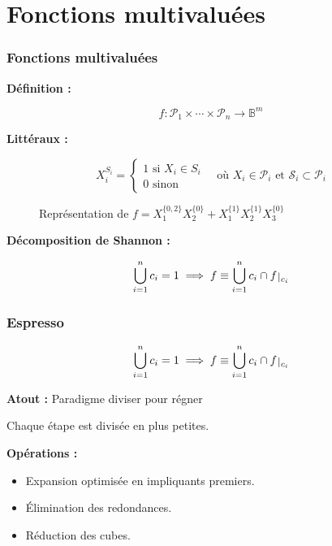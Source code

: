\documentclass[handout]{beamer}
\newcommand{\ens}[1]{{\lbrace{} #1 \rbrace{}}}
\def\restriction#1#2{\mathchoice
              {\setbox1\hbox{${\displaystyle #1}_{\scriptstyle #2}$}
              \restrictionaux{#1}{#2}}
              {\setbox1\hbox{${\textstyle #1}_{\scriptstyle #2}$}
              \restrictionaux{#1}{#2}}
              {\setbox1\hbox{${\scriptstyle #1}_{\scriptscriptstyle #2}$}
              \restrictionaux{#1}{#2}}
              {\setbox1\hbox{${\scriptscriptstyle #1}_{\scriptscriptstyle #2}$}
              \restrictionaux{#1}{#2}}}
\def\restrictionaux#1#2{{#1\,\smash{\vrule height .8\ht1 depth .85\dp1}}_{\,#2}}
\begin{document}
\section{Fonctions multivaluées}
\begin{frame}
  \frametitle{Fonctions multivaluées}

  \textbf{Définition :}
  \begin{mdframed}
  \[ f: \mathcal{P}_1 \times \cdots \times \mathcal{P}_n \longrightarrow \mathbb{B}^m \]
  \end{mdframed}

  \textbf{Littéraux :} 
  \begin{mdframed}
  \[{X_i^{S_i} = %
  \begin{cases}
    1 \text{ si } X_i \in S_i \\
    0 \text{ sinon}
  \end{cases}
  \quad \text{où } X_i \in \mathcal{P}_i \text{ et } \mathcal{S}_i \subset \mathcal{P}_i} \]
    \end{mdframed}  
  
  
  \begin{figure}
  \centering
	  \begin{tikzpicture}[scale=2]  
  		
	  \end{tikzpicture}
	  \caption{Représentation de $f = X_1^\ens{0,2} X_2^\ens{0} + X_1^\ens{1} X_2^\ens{1}X_3^\ens{0}$}
	\end{figure}

  \textbf{Décomposition de Shannon :}
  \begin{mdframed}
  \[ \bigcup_{i=1}^n c_i = 1 \implies f \equiv \bigcup_{i=1}^{n} c_i \cap \restriction{f}{c_i} \]
  \end{mdframed}

\end{frame}

\begin{frame}
  \frametitle{Espresso}

  \[ \bigcup_{i=1}^n c_i = 1 \implies f \equiv \bigcup_{i=1}^{n} c_i \cap \restriction{f}{c_i}\]

  \textbf{Atout :} Paradigme diviser pour régner
  \par Chaque étape est divisée en plus petites.
	
  \textbf{Opérations :}  
  \begin{itemize}
  \item Expansion optimisée en impliquants premiers.
  \item Élimination des redondances.
  \item Réduction des cubes.
  \end{itemize}
  
  
  
\end{frame}
\end{document}
